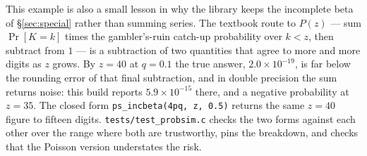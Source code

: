 \documentclass[11pt]{article}
\numberwithin{equation}{section}
\begin{document}
This example is also a small lesson in why the library keeps the
incomplete beta of \S\ref{sec:special} rather than summing series.  The
textbook route to $P(z)$ --- sum $\Pr[K=k]$ times the gambler's-ruin
catch-up probability over $k<z$, then subtract from $1$ --- is a
subtraction of two quantities that agree to more and more digits as $z$
grows.  By $z=40$ at $q=0.1$ the true answer, $2.0\times10^{-19}$, is
far below the rounding error of that final subtraction, and in double
precision the sum returns noise: this build reports $5.9\times10^{-15}$
there, and a negative probability at $z=35$.  The closed form
\texttt{ps\_incbeta(4pq,\,z,\,0.5)} returns the same $z=40$ figure to
fifteen digits.  \texttt{tests/test\_probsim.c} checks the two forms
against each other over the range where both are trustworthy, pins the
breakdown, and checks that the Poisson version understates the risk.
\end{document}
